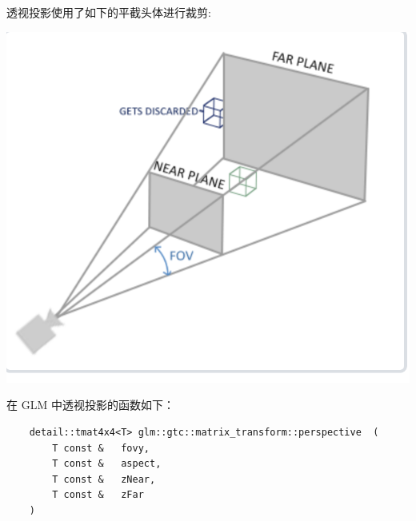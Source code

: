 \documentclass[12pt]{article}
\begin{document}
\begin{enumerate}
\begin{enumerate}
        透视投影使用了如下的平截头体进行裁剪:
        \begin{center}
            \includegraphics[scale=0.6]{persp_img.png}
        \end{center}
        在 GLM 中透视投影的函数如下：
        \begin{lstlisting}
    detail::tmat4x4<T> glm::gtc::matrix_transform::perspective 	( 	
        T const &  	fovy,
		T const &  	aspect,
		T const &  	zNear,
		T const &  	zFar 
	) 		
        \end{lstlisting}
        

\end{enumerate}
\end{enumerate}
\end{document}
